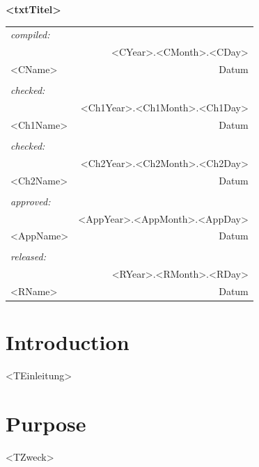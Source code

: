 \documentclass[a4paper,10pt,oneside,notitlepage]{article}
\date{02.06.19}
\renewcommand{\arraystretch}{1.3}
\begin{document}
\begin{center}
\textcolor{dark blue}{\textbf{\Large{<txtTitel>}}}


\begin{table}[H]
\centering
\renewcommand{\arraystretch}{1.8}
\setlength{\tabcolsep}{0.8cm}
\begin{tabular}{llr}
\multicolumn{3}{l}{\textit{compiled:}} \\
\multicolumn{2}{l}{} & <CYear>.<CMonth>.<CDay> \\ \hline
\multicolumn{2}{l}{<CName>} & Datum \\ \hline
\multicolumn{3}{l}{} \\
\multicolumn{3}{l}{\textit{checked:}} \\
\multicolumn{2}{l}{} & <Ch1Year>.<Ch1Month>.<Ch1Day> \\ \hline
\multicolumn{2}{l}{<Ch1Name>} & Datum \\ \hline
\multicolumn{3}{l}{} \\
\multicolumn{3}{l}{\textit{checked:}} \\
\multicolumn{2}{l}{} & <Ch2Year>.<Ch2Month>.<Ch2Day> \\ \hline
\multicolumn{2}{l}{<Ch2Name>} & Datum \\ \hline
\multicolumn{3}{l}{} \\
\multicolumn{3}{l}{\textit{approved:}} \\
\multicolumn{2}{l}{} & <AppYear>.<AppMonth>.<AppDay> \\ \hline
\multicolumn{2}{l}{<AppName>} & Datum \\ \hline
\multicolumn{3}{l}{} \\
\multicolumn{3}{l}{\textit{released:}} \\
\multicolumn{2}{l}{} & <RYear>.<RMonth>.<RDay> \\ \hline
\multicolumn{2}{l}{<RName>} & Datum \\ \hline
\end{tabular}
\end{table}
\end{center}

\newpage
\tableofcontents

\newpage

\section{Introduction}
<TEinleitung>


\section{Purpose}
<TZweck>
\end{document}
